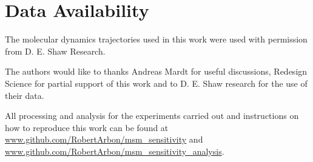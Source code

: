 \documentclass[journal=jacsat,manuscript=article]{achemso}
\begin{document}

\section{Data Availability}

The molecular dynamics trajectories used in this work were used with permission from D. E. Shaw Research. 

\begin{acknowledgement}

The authors would like to thanks Andreas Mardt for useful discussions, Redesign Science for partial support of this work and to D. E. Shaw research for the use of their data.  

\end{acknowledgement}

\begin{suppinfo}
All processing and analysis for the experiments carried out and instructions on how to reproduce this work can be found at \url{www.github.com/RobertArbon/msm_sensitivity} and \url{www.github.com/RobertArbon/msm_sensitivity_analysis}. 

\end{suppinfo}

%
%
\printbibliography
\end{document}
